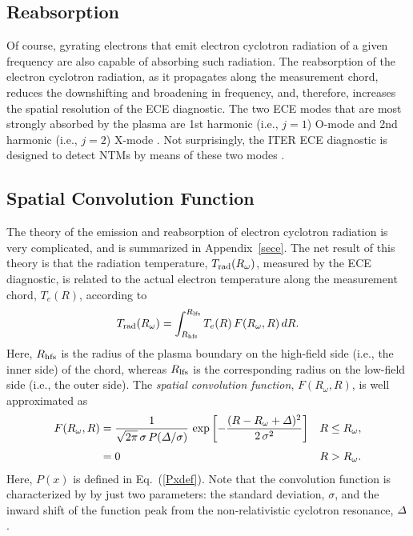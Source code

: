 \documentclass{iopjournal}
\begin{document}
\subsection{Reabsorption} 
Of course, gyrating electrons that emit electron cyclotron radiation of a given frequency are also capable of absorbing such radiation. 
 The reabsorption of the electron cyclotron radiation, as it propagates along the measurement chord, reduces the  downshifting and broadening
in frequency, and, therefore, increases the spatial resolution of the ECE diagnostic. The two ECE modes that are most strongly
absorbed by the plasma are 1st harmonic (i.e., $j=1$) O-mode and 2nd harmonic (i.e., $j=2$) X-mode \cite{bornatici}.
Not surprisingly, the ITER ECE diagnostic is designed  to detect NTMs by means of these two modes \cite{ece4a,ece5}.

\subsection{Spatial Convolution Function}
The theory of the emission and reabsorption of electron cyclotron radiation is very complicated, and is summarized in Appendix~\ref{sece}. 
The net result of this theory is that the radiation temperature, $T_{\rm rad}(R_\omega)$, measured by the ECE diagnostic, is related
to the actual electron temperature along the measurement chord, $T_e(R)$, according to
\begin{equation}
T_{\rm rad}(R_\omega)  = \int^{R_{\rm lfs}}_{R_{\rm hfs}} T_e(R)\,F(R_\omega, R)\,dR.
\end{equation}
Here, $R_{\rm hfs}$ is the radius
of the plasma boundary on the high-field side (i.e., the inner side) of the chord, whereas $R_{\rm lfs}$ is the corresponding radius 
on the low-field side (i.e., the outer side). The {\em spatial convolution function}, $F(R_\omega,R)$, is well approximated as
\begin{align}
F(R_\omega,R)&= \frac{1}{\sqrt{2\pi}\,\sigma \,P({\mit\Delta}/\sigma)}\,
\exp\left[-\frac {(R-R_\omega+{\mit\Delta})^2}{2\,\sigma^2}\right]&R\leq R_\omega,\\[0.5ex]
&= 0& R>R_\omega.
\end{align}
Here, $P(x)$ is defined in Eq.~(\ref{Pxdef}). Note that the convolution function is characterized by by just two parameters: the standard deviation, $\sigma$, and the inward shift
of the function peak from the non-relativistic cyclotron resonance, ${\mit\Delta}$. 
\end{document}
